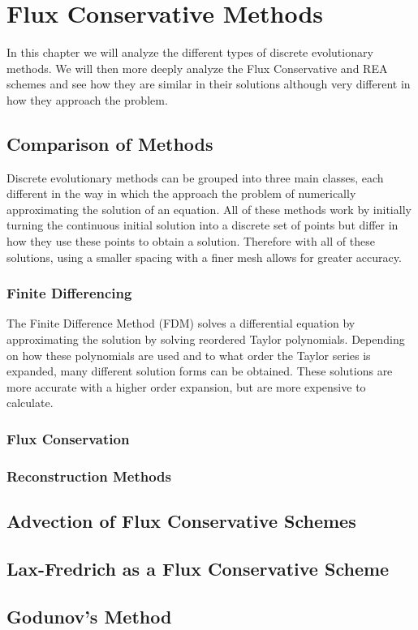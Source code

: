 \chapter{Flux Conservative Methods}
In this chapter we will analyze the different types of discrete evolutionary methods. We will then more deeply analyze the Flux Conservative and REA schemes and see how they are similar in  their solutions although very different in how they approach the problem.
\section{Comparison of Methods}
Discrete evolutionary methods can be grouped into three main classes, each different in the way in which the approach the problem of numerically approximating the solution of an equation. All of these methods work by initially turning the continuous initial solution into a discrete set of points but differ in how they use these points to obtain a solution. Therefore with all of these solutions, using a smaller spacing with a finer mesh allows for greater accuracy.
\subsection{Finite Differencing}
The Finite Difference Method (FDM) solves a differential equation by approximating the solution by solving reordered Taylor polynomials. Depending on how these polynomials are used and to what order the Taylor series is expanded, many different solution forms can be obtained. These solutions are more accurate with a higher order expansion, but are more expensive to calculate.
\subsection{Flux Conservation}
\subsection{Reconstruction Methods}
\section{Advection of Flux Conservative Schemes}
\section{Lax-Fredrich as a Flux Conservative Scheme}
\section{Godunov's Method}